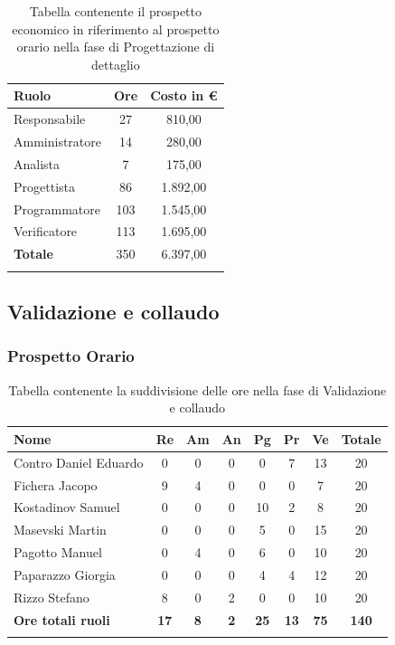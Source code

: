 \documentclass[../piano_di_progetto.tex]{subfiles}
\begin{document}
\begin{center}
	\begin{longtable}{|l|c|c|}
		\hline
		\rowcolor{lightgray}
		\textbf{Ruolo} & \textbf{Ore} & \textbf{Costo in €}\\
		\hline
		Responsabile & 27 & 810,00\\
		Amministratore & 14 & 280,00\\
		Analista & 7 & 175,00\\
		Progettista & 86 & 1.892,00\\
		Programmatore & 103 & 1.545,00\\
		Verificatore & 113 & 1.695,00\\
		\hline
		\textbf{Totale} & 350 & 6.397,00\\
		\hline
		\rowcolor{white}
		\caption{Tabella contenente il prospetto economico in riferimento al prospetto orario nella fase di Progettazione di dettaglio}
	\end{longtable}
\end{center}

\subsection{Validazione e collaudo}%
\label{sub:fase_valid_collaudo}
\subsubsection{Prospetto Orario}

\begin{center}
	\begin{longtable}{|l|c|c|c|c|c|c|c|}
		\hline
		\rowcolor{lightgray}
		\textbf{Nome} & \textbf{Re} & \textbf{Am} & \textbf{An} & \textbf{Pg}  & \textbf{Pr}   & \textbf{Ve} & \textbf{Totale} \\

		\hline
			Contro Daniel Eduardo & 0 & 0 & 0 & 0 & 7 & 13 & 20\\
			Fichera Jacopo & 9 & 4 & 0 & 0 & 0 & 7 & 20 \\ 
			Kostadinov Samuel & 0 & 0 & 0 & 10 & 2 & 8 & 20 \\ 		
			Masevski Martin & 0 & 0 & 0 & 5 & 0 & 15 & 20 \\
			Pagotto Manuel & 0 & 4 & 0 & 6 & 0 & 10 & 20 \\			
			Paparazzo Giorgia & 0 & 0 & 0 & 4 & 4 & 12 & 20 \\
			Rizzo Stefano & 8 & 0 & 2 & 0 & 0 & 10 & 20 \\
			\hline
			\textbf{Ore totali ruoli} & \textbf{17} & \textbf{8} & \textbf{2} & \textbf{25} & \textbf{13} & \textbf{75} & \textbf{140} \\
			\hline
		\rowcolor{white}
		\caption{Tabella contenente la suddivisione delle ore nella fase di Validazione e collaudo}
	\end{longtable}
\end{center}
\end{document}
